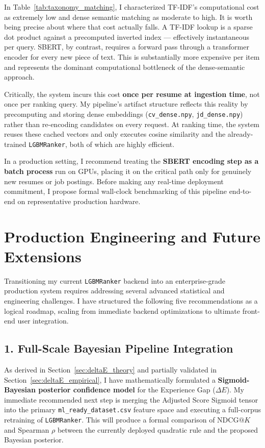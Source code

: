 In Table~\ref{tab:taxonomy_matching}, I characterized TF-IDF's computational cost as extremely low and dense semantic matching as moderate to high. It is worth being precise about where that cost actually falls. A TF-IDF lookup is a sparse dot product against a precomputed inverted index --- effectively instantaneous per query. SBERT, by contrast, requires a forward pass through a transformer encoder for every new piece of text. This is substantially more expensive per item and represents the dominant computational bottleneck of the dense-semantic approach.

Critically, the system incurs this cost \textbf{once per resume at ingestion time}, not once per ranking query. My pipeline's artifact structure reflects this reality by precomputing and storing dense embeddings (\texttt{cv\_dense.npy}, \texttt{jd\_dense.npy}) rather than re-encoding candidates on every request. At ranking time, the system reuses these cached vectors and only executes cosine similarity and the already-trained \texttt{LGBMRanker}, both of which are highly efficient. 

In a production setting, I recommend treating the \textbf{SBERT encoding step as a batch process} run on GPUs, placing it on the critical path only for genuinely new resumes or job postings. Before making any real-time deployment commitment, I propose formal wall-clock benchmarking of this pipeline end-to-end on representative production hardware.

\section{Production Engineering and Future Extensions}
\label{sec:future_work}

Transitioning my current \texttt{LGBMRanker} backend into an enterprise-grade production system requires addressing several advanced statistical and engineering challenges. I have structured the following five recommendations as a logical roadmap, scaling from immediate backend optimizations to ultimate front-end user integration.

\subsection{1. Full-Scale Bayesian Pipeline Integration}
As derived in Section~\ref{sec:deltaE_theory} and partially validated in Section~\ref{sec:deltaE_empirical}, I have mathematically formulated a \textbf{Sigmoid-Bayesian posterior confidence model} for the Experience Gap ($\Delta E$). My immediate recommended next step is merging the Adjusted Score Sigmoid tensor into the primary \texttt{ml\_ready\_dataset.csv} feature space and executing a full-corpus retraining of \texttt{LGBMRanker}. This will produce a formal comparison of $\text{NDCG}@K$ and Spearman $\rho$ between the currently deployed quadratic rule and the proposed Bayesian posterior.

